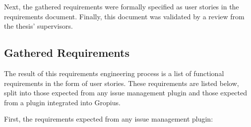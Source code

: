 Next, the gathered requirements were formally specified as user stories in the requirements document.
Finally, this document was validated by a review from the thesis' supervisors.


\subsection*{Gathered Requirements}
The result of this requirements engineering process is a list of functional requirements in the form of user stories.
These requirements are listed below, split into those expected from any issue management plugin and those expected from a plugin integrated into \gls{Gropius}.


First, the requirements expected from any issue management plugin:
